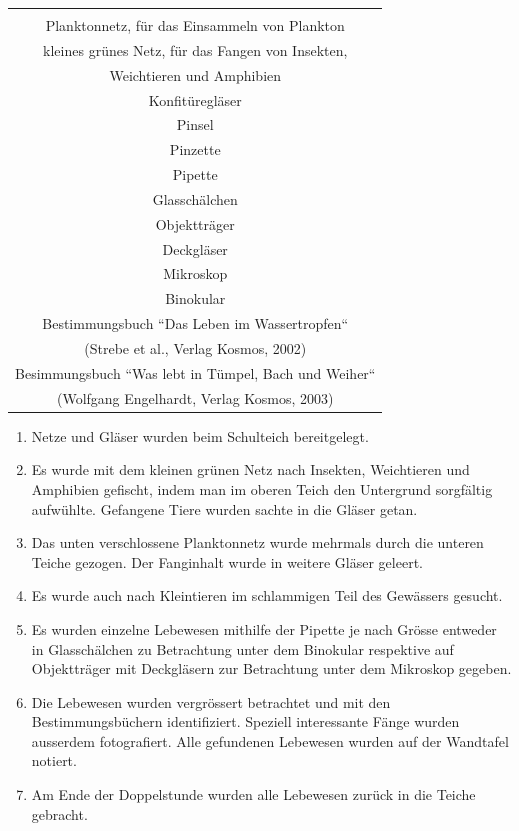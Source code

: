 \documentclass{article}
\begin{document}
        \begin{table}[h!]
        \centering
        \begin{tabular}{|c|} 
         \hline
         \\
         Planktonnetz, für das Einsammeln von Plankton \\
         kleines grünes Netz, für das Fangen von Insekten, \\ Weichtieren und Amphibien \\
         Konfitüregläser \\
         Pinsel \\
         Pinzette \\
         Pipette \\
         Glasschälchen \\
         Objektträger \\
         Deckgläser \\
         Mikroskop \\
         Binokular \\
         Bestimmungsbuch ``Das Leben im Wassertropfen`` \\ (Strebe et al., Verlag Kosmos, 2002) \\
         Besimmungsbuch ``Was lebt in Tümpel, Bach und Weiher`` \\ (Wolfgang Engelhardt, Verlag Kosmos, 2003) \\[2ex]
         \hline
        \end{tabular}
        \label{Tiere}
        \end{table}
        
        \begin{enumerate}
            \item Netze und Gläser wurden beim Schulteich bereitgelegt.
            \item Es wurde mit dem kleinen grünen Netz nach Insekten, Weichtieren und Amphibien gefischt, indem man im oberen Teich den Untergrund sorgfältig aufwühlte. Gefangene Tiere wurden sachte in die Gläser getan.
            \item Das unten verschlossene Planktonnetz wurde mehrmals durch die unteren Teiche gezogen. Der Fanginhalt wurde in weitere Gläser geleert.
            \item Es wurde auch nach Kleintieren im schlammigen Teil des Gewässers gesucht.
            \item Es wurden einzelne Lebewesen mithilfe der Pipette je nach Grösse entweder in Glasschälchen zu Betrachtung unter dem Binokular respektive auf Objektträger mit Deckgläsern zur Betrachtung unter dem Mikroskop gegeben.
            \item Die Lebewesen wurden vergrössert betrachtet und mit den Bestimmungsbüchern identifiziert. Speziell interessante Fänge wurden ausserdem fotografiert. Alle gefundenen Lebewesen wurden auf der Wandtafel notiert.
            \item Am Ende der Doppelstunde wurden alle Lebewesen zurück in die Teiche gebracht.
        \end{enumerate}
        
\end{document}
